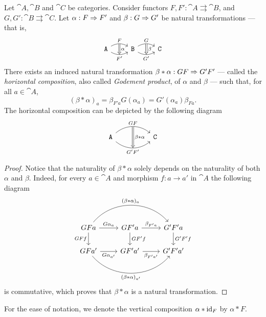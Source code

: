 \begin{proposition}
\label{prop:horizontal-composition-natural-transformation}
Let \(\cat A, \cat B\) and \(\cat C\) be categories. Consider functors \(F, F':
\cat A \rightrightarrows \cat B\), and \(G, G': \cat B \rightrightarrows \cat
C\).  Let \(\alpha: F \Rightarrow F'\) and \(\beta: G \Rightarrow G'\) be natural
transformations --- that is,
\[
  \begin{tikzcd}
    \cat A \ar[r, bend left, "F"{name=F}]
    \ar[r, bend right, "{F'}"'{name=FF}]
    &\cat B \ar[r, bend left, "G"{name=G}]
    \ar[r, bend right, "{G'}"'{name=GG}]
    & \cat C
    \ar[Rightarrow, from=F, to=FF, "\alpha"]
    \ar[Rightarrow, from=G, to=GG, "\beta"]
  \end{tikzcd}
\]
There exists an induced natural transformation
\(\beta * \alpha: G F \Rightarrow G' F'\) --- called the \emph{horizontal composition},
also called \emph{Godement product}, of \(\alpha\) and \(\beta\) --- such that,
for all \(a \in \cat A\),
\[
(\beta * \alpha)_a = \beta_{F' a} G(\alpha_a) = G'(\alpha_a) \beta_{F a}.
\]
The horizontal composition can be depicted by the following diagram
\[
  \begin{tikzcd}
    \cat A \ar[rr, bend left=40, "G F"{name=s}]
    \ar[rr, bend right=40, swap, "{G' F'}"{name=t}]
    &&\cat C
    \ar[Rightarrow, from=s, to=t, "\beta * \alpha"]
  \end{tikzcd}
\]
\end{proposition}

\begin{proof}
Notice that the naturality of \(\beta * \alpha\) solely depends on the
naturality of both \(\alpha\) and \(\beta\). Indeed, for every \(a \in \cat A\)
and morphism \(f: a \to a'\) in \(\cat A\) the following diagram
\[
\begin{tikzcd}
G F a \ar[d, "G F f"'] \ar[r, "G \alpha_a"]
\ar[rr, bend left=50, "{(\beta * \alpha)_{a}}"]
&G F' a \ar[r, "\beta_{F' a}"] \ar[d, "G F' f"]
& G' F' a \ar[d, "G' F' f"]
\\
G F a' \ar[r, "G \alpha_{a'}"']
\ar[rr, bend right=50, "{(\beta * \alpha)_{a'}}"']
&G F' a' \ar[r, "\beta_{F' a'}"']
&G' F' a'
\end{tikzcd}
\]
is commutative, which proves that \(\beta * \alpha\) is a natural
transformation.
\end{proof}

\begin{notation}
\label{not:horizontal-composition}
For the ease of notation, we denote the vertical composition \(\alpha * \operatorname{id}_F\)
by \(\alpha * F\).
\end{notation}

